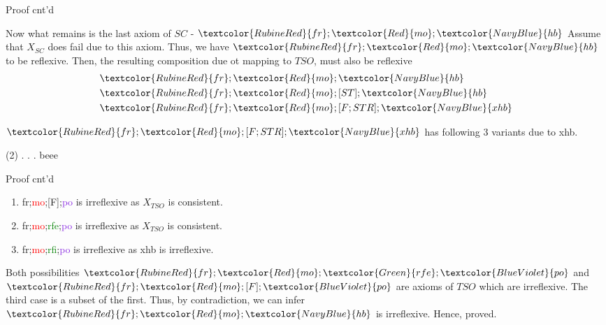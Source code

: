 \documentclass[xcolor={dvipsnames}, notes]{beamer}
\newcommand{\po}{\textcolor{BlueViolet}{po}}
\newcommand{\mo}{\textcolor{Red}{mo}}
\newcommand{\hb}{\textcolor{NavyBlue}{hb}}
\newcommand{\fr}{\textcolor{RubineRed}{fr}}
\newcommand{\xhb}{\textcolor{NavyBlue}{xhb}}
\newcommand{\rfe}{\textcolor{Green}{rfe}}
\newcommand{\rfi}{\textcolor{Green}{rfi}}
\begin{document}
    \begin{frame}{Proof cnt'd}
        
        Now what remains is the last axiom of $SC$ - ${\fr;\mo;\hb}$
        Assume that $X_{SC}$ does fail due to this axiom.
        Thus, we have ${\fr;\mo;\hb}$ to be reflexive. 
        Then, the resulting composition due ot mapping to $TSO$, must also be reflexive 
        \begin{align*}
            &{\fr;\mo;\hb} \\
            &{\fr;\mo;[ST];\hb} \\
            &{\fr;\mo;[F;STR];\xhb}  
        \end{align*}

        $\fr;\mo;[F;STR];\xhb$ has following 3 variants due to {\xhb}.
        \begin{tasks}(2)
            \task {\fr;\mo;[F];\po}.
            \task {\fr;\mo;\rfe;\po}.
            \task {\fr;\mo;\rfi;\po}.
            \task beee
        \end{tasks}
        
    \end{frame}

    \begin{frame}{Proof cnt'd}
        
        \begin{enumerate}
            \item {\fr;\mo;[F];\po} is irreflexive as $X_{TSO}$ is consistent.
            \item {\fr;\mo;\rfe;\po} is irreflexive as $X_{TSO}$ is consistent.
            \item {\fr;\mo;\rfi;\po} is irreflexive as {\xhb} is irreflexive. 
        \end{enumerate}

        Both possibilities $\fr;\mo;\rfe;\po$ and $\fr;\mo;[F];\po$ are axioms of $TSO$ which are irreflexive.
        The third case is a subset of the first. 
        Thus, by contradiction, we can infer $\fr;\mo;\hb$ is irreflexive.
        Hence, proved.

    \end{frame}
\end{document}
